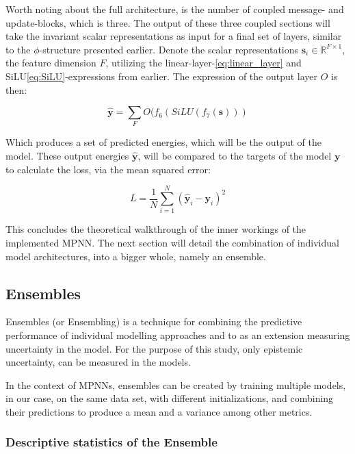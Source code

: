 Worth noting about the full architecture, is the number of coupled message- and update-blocks, which is three. The output of these three
coupled sections will take the invariant scalar representations as input for a final set of layers, similar to the $\phi$-structure
presented earlier. Denote the scalar representations $\mathbf{s}_{i} \in \mathbb{R}^{F \times 1}$, the feature dimension $F$, utilizing the linear-layer-\ref{eq:linear_layer} and
SiLU\ref{eq:SiLU}-expressions from earlier. The expression of the output layer $O$ is then:

\begin{equation}
    \hat{\mathbf{y}} = \sum_{F} O(f_{6}(SiLU(f_{7}(\mathbf{s})))
\end{equation}

Which produces a set of predicted energies, which will be the output of the model. These output energies $\hat{\mathbf{y}}$, will be
compared to the targets of the model $\mathbf{y}$ to calculate the loss, via the mean squared error:

\begin{equation}\label{eq:loss}
    L = \frac{1}{N} \sum_{i=1}^N \left ( \hat{\mathbf{y}}_i - \mathbf{y}_i \right )^2
\end{equation}

This concludes the theoretical walkthrough of the inner workings of the implemented MPNN. The next section will detail the combination
of individual model architectures, into a bigger whole, namely an ensemble.

\subsection{Ensembles}

Ensembles (or Ensembling) is a technique for combining the predictive performance of individual modelling approaches
and to as an extension measuring uncertainty in the model. For the purpose of this study, only epistemic uncertainty, can be measured
in the models.

In the context of MPNNs, ensembles can be created by training multiple models, in our case, on the same data set, 
with different initializations,
and combining their predictions to produce a mean and a variance among other metrics.

\subsubsection{Descriptive statistics of the Ensemble}


